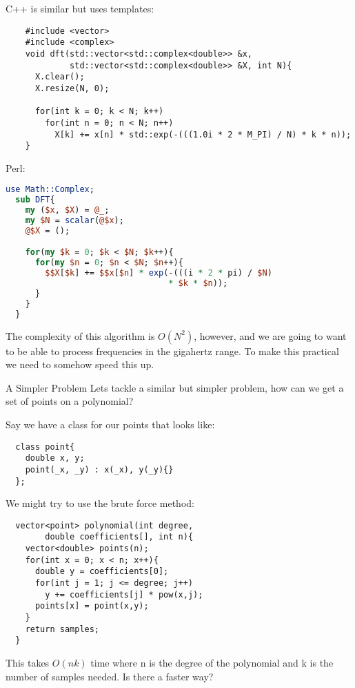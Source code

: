 \documentclass{beamer}
\begin{document}
\begin{frame}[fragile]
  C++ is similar but uses templates:
  \begin{lstlisting}
    #include <vector>
    #include <complex>
    void dft(std::vector<std::complex<double>> &x, 
             std::vector<std::complex<double>> &X, int N){
      X.clear();
      X.resize(N, 0);
  
      for(int k = 0; k < N; k++)
        for(int n = 0; n < N; n++)
          X[k] += x[n] * std::exp(-(((1.0i * 2 * M_PI) / N) * k * n));
    }
  \end{lstlisting}
\end{frame}
\begin{frame}[fragile]

  Perl:
  \begin{lstlisting}[language=Perl]
  use Math::Complex;
  sub DFT{
    my ($x, $X) = @_;
    my $N = scalar(@$x);
    @$X = ();

    for(my $k = 0; $k < $N; $k++){
      for(my $n = 0; $n < $N; $n++){
        $$X[$k] += $$x[$n] * exp(-(((i * 2 * pi) / $N)
                                 * $k * $n));
      }
    }
  }
\end{lstlisting}

  The complexity of this algorithm is $O(N^2)$, however, and we are going to want to be able to process frequencies in the gigahertz range. To make this practical we need to somehow speed this up.

\end{frame}
\begin{frame}[fragile]{A Simpler Problem}
  Lets tackle a similar but simpler problem, how can we get a set of points on a polynomial?

  Say we have a class for our points that looks like:
  \begin{lstlisting}
  class point{
    double x, y;
    point(_x, _y) : x(_x), y(_y){}
  };
\end{lstlisting}
  We might try to use the brute force method:
  \begin{lstlisting}
  vector<point> polynomial(int degree,
        double coefficients[], int n){
    vector<double> points(n);
    for(int x = 0; x < n; x++){
      double y = coefficients[0];
      for(int j = 1; j <= degree; j++)
        y += coefficients[j] * pow(x,j);
      points[x] = point(x,y);
    }
    return samples;
  }
\end{lstlisting}
\end{frame}

\begin{frame}
  This takes $O(nk)$ time where n is the degree of the polynomial and k is the number of samples needed. Is there a faster way?
\end{frame}
\end{document}

